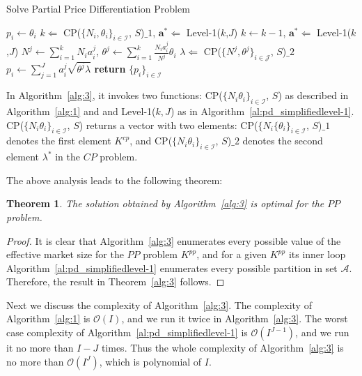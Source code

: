 \documentclass[twocolumn,10pt,twosided]{IEEEtran}
\newtheorem{theorem}{Theorem}
\begin{document}
\begin{algorithm}[htb]                      \caption{Solve Partial Price Differentiation Problem}     \begin{algorithmic}[1]
		\State $p_i\gets\theta_i$ \State $k\Leftarrow$ {CP}($\{N_i,\theta_i\}_{i\in{\mathcal{I}}}$, $S$)$\_1$, $\boldsymbol{a}^*\Leftarrow$ Level-1($k$,$J$) \State $k\gets k-1$, $\boldsymbol{a}^*\Leftarrow$ Level-1($k$,$J$)
\EndWhile  {} \State $N^j\gets\sum_{i=1}^k N_i a_i^j$, $\theta^j\gets\sum_{i=1}^k\frac{N_ia_i^j}{N^j}\theta_i$
		\EndFor
		\State $\lambda\Leftarrow$ CP($\{N^j,\theta^j\}_{i\in{\mathcal{J}}}$, $S$)$\_2$
	 \State $p_i\gets \sum_{j=1}^{J}a_i^j\sqrt{\theta^j\lambda}$
	\EndFor
   \State \textbf{return} $\{p_i\}_{i\in\mathcal{I}}$
\end{algorithmic}
\label{alg:3}                      \end{algorithm}
In Algorithm~\ref{alg:3}, it invokes two functions: CP($\{N_i\theta_i\}_{i\in{\mathcal{I}}}$, $S$) as described in Algorithm~\ref{alg:1} and  and Level-1($k,J$) as in Algorithm~\ref{al:pd_simplifiedlevel-1}. CP($\{N_i\theta_i\}_{i\in{\mathcal{I}}}$, $S$) returns a vector with two elements: CP($\{N_i\{\theta_i\}_{i\in{\mathcal{I}}}$, $S$)$\_1$ denotes the first element $K^{cp}$, and {CP}($\{N_i\theta_i\}_{i\in{\mathcal{I}}}$, $S$)$\_2$ denotes the second element $\lambda^*$ in the $CP$ problem.


The above analysis leads to the following theorem:
\begin{theorem}
The solution obtained by Algorithm~\ref{alg:3} is optimal for the $PP$ problem.
\end{theorem}

\begin{proof}
It is clear that Algorithm~\ref{alg:3} enumerates every possible value of the effective market size for the $PP$ problem $K^{pp}$, and for a given $K^{pp}$ its inner loop Algorithm~\ref{al:pd_simplifiedlevel-1} enumerates every possible partition in set $\mathcal{A}$. Therefore, the result in Theorem~\ref{alg:3} follows.
\end{proof}

Next we discuss the complexity of Algorithm~\ref{alg:3}. The complexity of Algorithm~\ref{alg:1} is $\mathcal{O}(I)$, and we run it twice in Algorithm~\ref{alg:3}. The worst case complexity of  Algorithm~\ref{al:pd_simplifiedlevel-1}  is $\mathcal{O}({I}^{J-1})$, and we run it no more than $I-J$ times. Thus the whole complexity of Algorithm~\ref{alg:3} is no more than $\mathcal{O}({I}^{J})$, which is polynomial of $I$.
\end{document}
